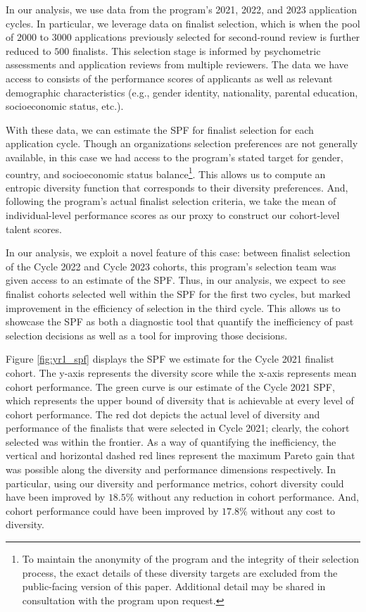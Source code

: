 In our analysis, we use data from the program's 2021, 2022, and 2023 application cycles. In particular, we leverage data on finalist selection, which is when the pool of $2000$ to $3000$ applications previously selected for second-round review is further reduced to $500$ finalists. This selection stage is informed by psychometric assessments and application reviews from multiple reviewers. The data we have access to consists of the performance scores of applicants as well as relevant demographic characteristics (e.g., gender identity, nationality, parental education, socioeconomic status, etc.). 

With these data, we can estimate the SPF for finalist selection for each application cycle. Though an organizations selection preferences are not generally available, in this case we had
access to the program's stated target for gender, country, and socioeconomic status balance\footnote{To maintain the anonymity of the program and the integrity of their selection process, the exact details of these diversity targets are excluded from the public-facing version of this paper. Additional detail may be shared in consultation with the program upon request.}. This allows us to compute an entropic diversity function that corresponds to their diversity preferences. And, following the program's actual finalist selection criteria, we take the mean of individual-level performance scores as our proxy to construct our cohort-level talent scores. 

In our analysis, we exploit a novel feature of this case: between finalist selection of the Cycle 2022 and Cycle 2023 cohorts, this program's selection team was given access to an estimate of the SPF. Thus, in our analysis, we expect to see finalist cohorts selected well within the SPF for the first two cycles, but marked improvement in the efficiency of selection in the third cycle. This allows us to showcase the SPF as both a diagnostic tool that quantify the inefficiency of past selection decisions as well as a tool for improving those decisions. 

Figure \ref{fig:yr1_spf} displays the SPF we estimate for the Cycle 2021 finalist cohort. The y-axis represents the diversity score while the x-axis represents mean cohort performance. The green curve is our estimate of the Cycle 2021 SPF, which represents the upper bound of diversity that is achievable at every level of cohort performance. The red dot depicts the actual level of diversity and performance of the finalists that were selected in Cycle 2021; clearly, the cohort selected was within the frontier. As a way of quantifying the inefficiency, the vertical and horizontal dashed red lines represent the maximum Pareto gain that was possible along the diversity and performance dimensions respectively. In particular, using our diversity and performance metrics, cohort diversity could have been improved by $18.5\%$ without any reduction in cohort performance. And, cohort performance could have been improved by $17.8\%$ without any cost to diversity. 

